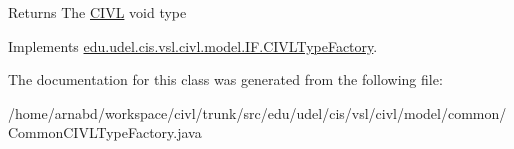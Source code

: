 \begin{DoxyReturn}{Returns}
The \hyperlink{classedu_1_1udel_1_1cis_1_1vsl_1_1civl_1_1CIVL}{C\+I\+V\+L} void type 
\end{DoxyReturn}


Implements \hyperlink{interfaceedu_1_1udel_1_1cis_1_1vsl_1_1civl_1_1model_1_1IF_1_1CIVLTypeFactory_aff4b164f7b7a02e3173d88ac2ed9026f}{edu.\+udel.\+cis.\+vsl.\+civl.\+model.\+I\+F.\+C\+I\+V\+L\+Type\+Factory}.



The documentation for this class was generated from the following file\+:\begin{DoxyCompactItemize}
\item 
/home/arnabd/workspace/civl/trunk/src/edu/udel/cis/vsl/civl/model/common/Common\+C\+I\+V\+L\+Type\+Factory.\+java\end{DoxyCompactItemize}
